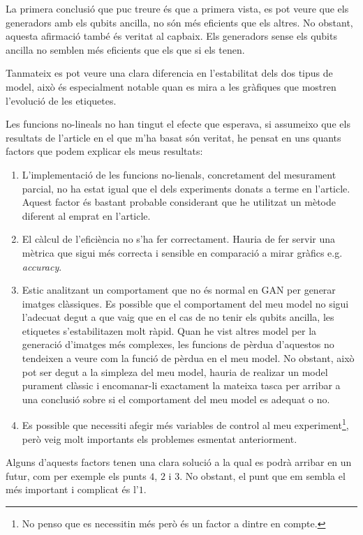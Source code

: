 

La primera conclusió que puc treure és que a primera vista, es pot veure que els generadors amb els qubits ancilla, no són més eficients que els altres. No obstant, aquesta afirmació també és veritat al capbaix. Els generadors sense els qubits ancilla no semblen més eficients que els que si els tenen. 

Tanmateix es pot veure una clara diferencia en l'estabilitat dels dos tipus de model, això és especialment notable quan es mira a les gràfiques que mostren l'evolució de les etiquetes.  

Les funcions no-lineals no han tingut el efecte que esperava, si assumeixo que els resultats de l'article en el que m'ha basat són veritat, he pensat en uns quants factors que podem explicar els meus resultats: 
\begin{enumerate}
	\item L'implementació de les funcions no-lienals, concretament del mesurament parcial, no ha estat igual que el dels experiments donats a terme en l'article. Aquest factor és bastant probable considerant que he utilitzat un mètode diferent al emprat en l'article.
	\item El càlcul de l'eficiència no s'ha fer correctament. Hauria de fer servir una mètrica que sigui més correcta i sensible en comparació a mirar gràfics e.g. \textit{accuracy}. 
	\item Estic analitzant un comportament que no és normal en GAN per generar imatges clàssiques. Es possible que el comportament del meu model no sigui l'adecuat degut a que vaig que en el cas de no tenir els qubits ancilla, les etiquetes s'estabilitazen molt ràpid. Quan he vist altres model per la generació d'imatges més complexes, les funcions de pèrdua d'aquestos no tendeixen a veure com la funció de pèrdua en el meu model. No obstant, això pot ser degut a la simpleza del meu model, hauria de realizar un model purament clàssic i encomanar-li exactament la mateixa tasca per arribar a una conclusió sobre si el comportament del meu model es adequat o no. 
	\item Es possible que necessiti afegir més variables de control al meu experiment\footnote{No penso que es necessitin més però és un factor a dintre en compte.}, però veig molt importants els problemes esmentat anteriorment. 
\end{enumerate}

Alguns d'aquests factors tenen una clara solució a la qual es podrà arribar en un futur, com per exemple els punts $4$, $2$ i $3$. No obstant, el punt que em sembla el més important i complicat és l'$1$. 

